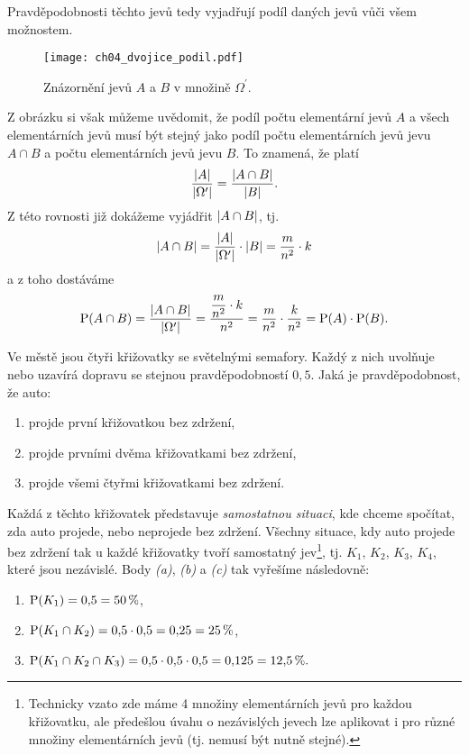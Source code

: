Pravděpodobnosti těchto jevů tedy vyjadřují podíl daných jevů vůči všem možnostem.
\begin{figure}[H]
    \centering
    \texttt{[image: ch04\_dvojice\_podil.pdf]}
    \caption{Znázornění jevů $A$ a $B$ v množině $\Omega^\prime$.}
    \label{fig:dvojice_podil}
\end{figure}
Z obrázku si však můžeme uvědomit, že podíl počtu elementární jevů $A$ a všech elementárních jevů musí být stejný jako podíl počtu elementárních jevů jevu $A\cap B$ a počtu elementárních jevů jevu $B$. To znamená, že platí
\[\dfrac{\left| A \right|}{\left| \Omega^\prime \right|}=\dfrac{\left| A\cap B \right|}{\left| B \right|}.\]
Z této rovnosti již dokážeme vyjádřit $\left| A\cap B \right|$, tj.
\[\left| A\cap B \right|=\dfrac{\left| A \right|}{\left| \Omega^\prime \right|}\cdot\left| B \right|=\dfrac{m}{n^2}\cdot k\]
a z toho dostáváme
\[\operatorname{\text{P}}(A\cap B)=\dfrac{\left| A\cap B \right|}{\left| \Omega^\prime \right|}=\dfrac{\dfrac{m}{n^2}\cdot k}{n^2}=\dfrac{m}{n^2}\cdot\dfrac{k}{n^2}=\operatorname{\text{P}}(A)\cdot\operatorname{\text{P}}(B).\]
\medskip

\begin{task}
    Ve městě jsou čtyři křižovatky se světelnými semafory. Každý z nich uvolňuje nebo uzavírá dopravu se stejnou pravděpodobností $0{,}5$. Jaká je pravděpodobnost, že auto:
    \begin{enumerate}[label=(\alph*)]
        \item projde první křižovatkou bez zdržení,
        \item projde prvními dvěma křižovatkami bez zdržení,
        \item projde všemi čtyřmi křižovatkami bez zdržení.
    \end{enumerate}
\end{task}
\begin{solution}
    Každá z těchto křižovatek představuje \emph{samostatnou situaci}, kde chceme spočítat, zda auto projede, nebo neprojede bez zdržení. Všechny situace, kdy auto projede bez zdržení tak u každé křižovatky tvoří samostatný jev\footnote{Technicky vzato zde máme 4 množiny elementárních jevů pro každou křižovatku, ale předešlou úvahu o nezávislých jevech lze aplikovat i pro různé množiny elementárních jevů (tj. nemusí být nutně stejné).}, tj. $K_1,\,K_2,\,K_3,\,K_4$, které jsou nezávislé. Body \textit{(a)}, \textit{(b)} a \textit{(c)} tak vyřešíme následovně:
    \begin{enumerate}[label=(\alph*)]
        \item $\displaystyle \operatorname{\text{P}}(K_1)=0{,}5=50\,\%$,
        \item $\displaystyle \operatorname{\text{P}}(K_1\cap K_2)=0{,}5\cdot 0{,}5=0{,}25=25\,\%$,
        \item $\displaystyle \operatorname{\text{P}}(K_1\cap K_2\cap K_3)=0{,}5\cdot 0{,}5\cdot 0{,}5=0{,}125=12{,}5\,\%.$
    \end{enumerate}
\end{solution}